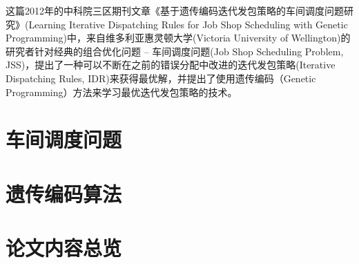这篇2012年的中科院三区期刊文章《基于遗传编码迭代发包策略的车间调度问题研究》(Learning Iterative Dispatching Rules for Job Shop Scheduling with Genetic Programming)中，来自维多利亚惠灵顿大学(Victoria University of Wellington)的研究者针对经典的组合优化问题 -- 车间调度问题(Job Shop Scheduling Problem, JSS)，提出了一种可以不断在之前的错误分配中改进的迭代发包策略(Iterative Dispatching Rules, IDR)来获得最优解，并提出了使用遗传编码（Genetic Programming）方法来学习最优迭代发包策略的技术。

\section{车间调度问题}

\section{遗传编码算法}

\section{论文内容总览}

